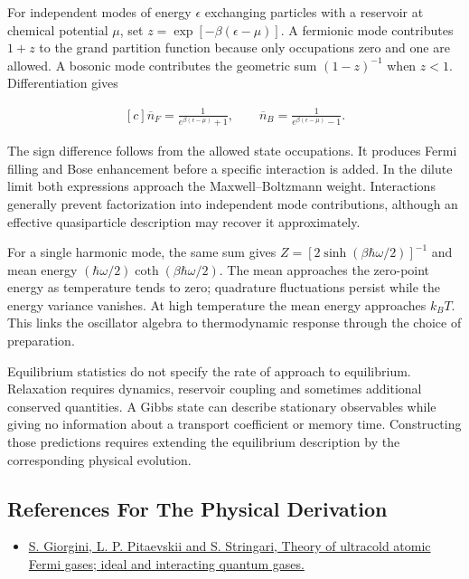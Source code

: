 \documentclass[11pt,oneside]{book}
\newenvironment{centeredalign}{\[\begin{gathered}[c]}{\end{gathered}\]}
\begin{document}
For independent modes of energy \(\epsilon\) exchanging particles with a reservoir at chemical potential \(\mu\), set \(z=\exp[-\beta(\epsilon-\mu)]\). A fermionic mode contributes \(1+z\) to the grand partition function because only occupations zero and one are allowed. A bosonic mode contributes the geometric sum \((1-z)^{-1}\) when \(z<1\). Differentiation gives

\begin{centeredalign}
\overline n_F=\frac{1}{e^{\beta(\epsilon-\mu)}+1},\qquad
\overline n_B=\frac{1}{e^{\beta(\epsilon-\mu)}-1}.
\end{centeredalign}

The sign difference follows from the allowed state occupations. It produces Fermi filling and Bose enhancement before a specific interaction is added. In the dilute limit both expressions approach the Maxwell--Boltzmann weight. Interactions generally prevent factorization into independent mode contributions, although an effective quasiparticle description may recover it approximately.

For a single harmonic mode, the same sum gives \(Z=[2\sinh(\beta\hbar\omega/2)]^{-1}\) and mean energy \((\hbar\omega/2)\coth(\beta\hbar\omega/2)\). The mean approaches the zero-point energy as temperature tends to zero; quadrature fluctuations persist while the energy variance vanishes. At high temperature the mean energy approaches \(k_BT\). This links the oscillator algebra to thermodynamic response through the choice of preparation.

Equilibrium statistics do not specify the rate of approach to equilibrium. Relaxation requires dynamics, reservoir coupling and sometimes additional conserved quantities. A Gibbs state can describe stationary observables while giving no information about a transport coefficient or memory time. Constructing those predictions requires extending the equilibrium description by the corresponding physical evolution.

\subsection*{References For The Physical Derivation}
\begin{itemize}
\item \href{https://arxiv.org/abs/0706.3360}{S. Giorgini, L. P. Pitaevskii and S. Stringari, Theory of ultracold atomic Fermi gases; ideal and interacting quantum gases.}
\end{itemize}
\end{document}

